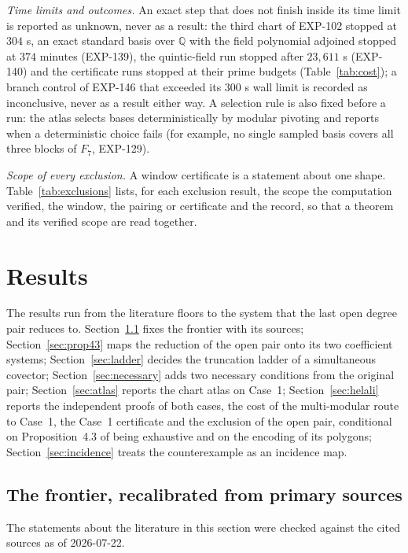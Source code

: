 \documentclass[11pt]{article}
\theoremstyle{remark}
\newcommand{\Q}{\mathbb{Q}}
\begin{document}
\emph{Time limits and outcomes.} An exact step that does not finish inside its time limit is reported as unknown, never as a
result: the third chart of EXP-102 stopped at $304$ s, an exact standard basis over $\Q$ with the field polynomial adjoined stopped at $374$ minutes
(EXP-139), the quintic-field run stopped after $23{,}611$ s (EXP-140) and the certificate runs stopped at their prime budgets
(Table~\ref{tab:cost}); a branch control of EXP-146 that exceeded its $300$ s wall limit is recorded as inconclusive, never as a result either way. A selection rule is also fixed before a run: the atlas selects bases deterministically by modular pivoting
and reports when a deterministic choice fails (for example, no single sampled basis covers all three blocks of $F_7$, EXP-129).

\emph{Scope of every exclusion.} A window certificate is a statement about one shape. Table~\ref{tab:exclusions} lists, for
each exclusion result, the scope the computation verified, the window, the pairing or certificate and the record, so that a
theorem and its verified scope are read together.



\section{Results}\label{sec:results}

The results run from the literature floors to the system that the last open degree pair reduces to. Section~\ref{sec:frontier} fixes the
frontier with its sources; Section~\ref{sec:prop43} maps the reduction of the open pair onto its two coefficient systems; Section~\ref{sec:ladder} decides the
truncation ladder of a simultaneous covector; Section~\ref{sec:necessary} adds two necessary conditions from the original pair; Section~\ref{sec:atlas} reports the chart atlas on Case~1;
Section~\ref{sec:helali} reports the independent proofs of both cases, the cost of the multi-modular route to Case~1, the Case~1 certificate and the exclusion of the open pair, conditional on Proposition~4.3 of \cite{GGHV2022} being exhaustive and on the encoding of its polygons; Section~\ref{sec:incidence} treats the counterexample as an incidence map.
\subsection{The frontier, recalibrated from primary sources}\label{sec:frontier}

The statements about the literature in this section were checked against the cited
sources as of 2026-07-22.
\end{document}
